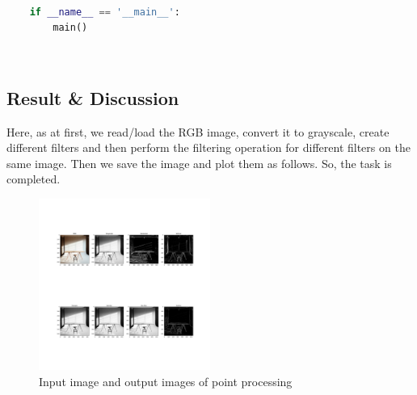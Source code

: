 \documentclass{article}
\begin{document}
{\begin{lstlisting}[language=Python, caption=Code for image filtering based on different filters]
    
    if __name__ == '__main__':
        main()

    \end{lstlisting}
    \\
    \subsection{Result & Discussion}{
        Here, as at first, we read/load the RGB image, convert it to grayscale, create different filters and then perform the filtering operation for different filters on the same image. Then we save the image and plot them as follows. So, the task is completed.
        
        \begin{figure}[htp]
            \centering
            \includegraphics[width=0.5\textwidth]{Assignment-3/fig-1.jpg}
            \caption{Input image and output images of point processing}
        \end{figure}
    }
}
\clearpage
\end{document}
